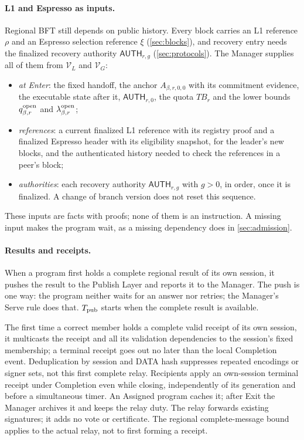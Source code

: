 \documentclass[11pt,a4paper]{article}
\newcommand{\TB}{\mathit{TB}}
\newcommand{\tagg}[1]{\ensuremath{\mathsf{#1}}}
\newcounter{protocol}
\begin{document}
\paragraph{L1 and Espresso as inputs.}
Regional BFT still depends on public history. Every block carries an L1
reference $\rho$ and an Espresso selection reference $\xi$
(\cref{sec:blocks}), and recovery entry needs the finalized recovery
authority $\tagg{AUTH}_{r,g}$ (\cref{sec:protocols}). The Manager
supplies all of them from $\mathcal V_L$ and $\mathcal V_G$:
\begin{itemize}
\item \emph{at Enter}: the fixed handoff, the anchor $A_{\beta,r,0,0}$
with its commitment evidence, the executable state after it,
$\tagg{AUTH}_{r,0}$, the quota $\TB_r$ and the lower bounds
$q^{\rm open}_{\beta,r}$ and $\lambda^{\rm open}_{\beta,r}$;
\item \emph{references}: a current finalized L1 reference with its
registry proof and a finalized Espresso header with its eligibility
snapshot, for the leader's new blocks, and the authenticated history
needed to check the references in a peer's block;
\item \emph{authorities}: each recovery authority $\tagg{AUTH}_{r,g}$
with $g>0$, in order, once it is finalized. A change of branch version
does not reset this sequence.
\end{itemize}
These inputs are facts with proofs; none of them is an instruction. A
missing input makes the program wait, as a missing dependency does in
\cref{sec:admission}.

\paragraph{Results and receipts.}
\label{sec:retirement-receipt-relay}
When a program first holds a complete regional result of its own
session, it pushes the result to the Publish Layer and reports it to the
Manager. The push is one way: the program neither waits for an answer
nor retries; the Manager's Serve rule does that. $T_{\rm pub}$ starts
when the complete result is available.

The first time a correct member holds a complete valid receipt of its
own session, it multicasts the receipt and all its validation
dependencies to the session's fixed membership; a terminal receipt goes
out no later than the local Completion event. Deduplication by session
and DATA hash suppresses repeated encodings or signer sets, not this
first complete relay. Recipients apply an own-session terminal receipt
under Completion even while closing, independently of its generation and
before a simultaneous timer. An Assigned program caches it; after Exit
the Manager archives it and keeps the relay duty. The relay forwards
existing signatures; it adds no vote or certificate. The regional
complete-message bound applies to the actual relay, not to first forming
a receipt.
\end{document}
